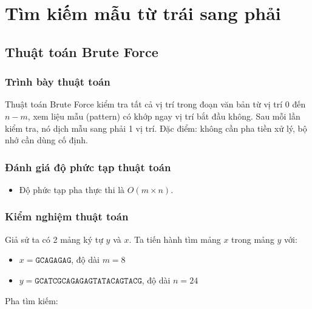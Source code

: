 \documentclass[12pt,twoside,openright]{extreport}
\begin{document}
\chapter{Tìm kiếm mẫu từ trái sang phải}

\section{Thuật toán Brute Force}

\subsection{Trình bày thuật toán}

Thuật toán Brute Force kiểm tra tất cả vị trí trong đoạn văn bản từ vị trí 0 đến $n - m$, xem liệu mẫu (pattern) có khớp ngay vị trí bắt đầu không. Sau mỗi lần kiểm tra, nó dịch mẫu sang phải 1 vị trí. Đặc điểm: không cần pha tiền xử lý, bộ nhớ cần dùng cố định.

\subsection{Đánh giá độ phức tạp thuật toán}

\begin{itemize}
	\item Độ phức tạp pha thực thi là $O(m \times n)$.
\end{itemize}

\subsection{Kiểm nghiệm thuật toán}

Giả sử ta có 2 mảng ký tự $y$ và $x$. Ta tiến hành tìm mảng $x$ trong mảng $y$ với:
\begin{itemize}
	\item $x = \texttt{GCAGAGAG}$, độ dài $m = 8$
	\item $y = \texttt{GCATCGCAGAGAGTATACAGTACG}$, độ dài $n = 24$
\end{itemize}

Pha tìm kiếm:
\end{document}

